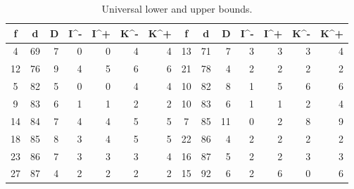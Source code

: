 \begin{table}[htbp]
\caption{Universal lower and upper bounds.}
\label{finite:enclosures}
\begin{tabular}{cc|r|rrrr@{\qquad}cc|r|rrrr}
 f&d&D&I^-&I^+&K^-&K^+&f&d&D&I^-&I^+&K^-&K^+\\\hline
 4&69&7&0&0&4&4&13&71&7&3&3&3&4\\
 12&76&9&4&5&6&6&21&78&4&2&2&2&2\\
 5&82&5&0&0&4&4&10&82&8&1&5&6&6\\
 9&83&6&1&1&2&2&10&83&6&1&1&2&4\\
 14&84&7&4&4&5&5&7&85&11&0&2&8&9\\
 18&85&8&3&4&5&5&22&86&4&2&2&2&2\\
 23&86&7&3&3&3&4&16&87&5&2&2&3&3\\
 27&87&4&2&2&2&2&15&92&6&2&6&0&6
\end{tabular}
\end{table}
